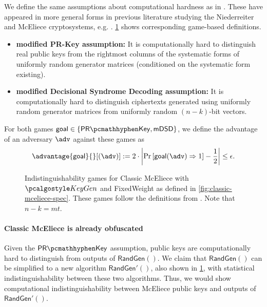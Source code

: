 We define the same assumptions about computational hardness as in \cite[Definition~K.1]{EC:Xagawa22}. These have appeared in more general forms in previous literature studying the Niederreiter and McEliece cryptosystems, e.g. \cite{AC:CouFinSen01,EC:SaiXagYam18}. \cref{fig:classic-mceliece-assumptions} shows corresponding game-based definitions.
\begin{itemize}
    \item \textbf{modified PR-Key assumption:} It is computationally hard to distinguish real public keys from the rightmost columns of the systematic forms of uniformly random generator matrices (conditioned on the systematic form existing).
    \item \textbf{modified Decisional Syndrome Decoding assumption:} It is computationally hard to distinguish ciphertexts generated using uniformly random generator matrices from uniformly random $(n-k)$-bit vectors.
\end{itemize}

For both games $\mathsf{goal} \in \{\prkey, \mdsd\}$, we define the advantage of an adversary $\adv$ against these games as
\[
    \advantage{\mathsf{goal}}{}[(\adv)]
    := 2 \cdot \left| \Pr\left[\mathsf{goal}(\adv) \Rightarrow 1\right] - \frac{1}{2} \right|
    \leq \epsilon.
\]

\begin{figure}
    
    \caption[
        Indistinguishability games for Classic McEliece.
    ]{
        Indistinguishability games for Classic McEliece with $\kgen$ and \textsf{FixedWeight} as defined in \cref{fig:classic-mceliece-spec}. These games follow the definitions from \cite[Definition~K.1]{EC:Xagawa22}. Note that $n-k = mt$.}
    \label{fig:classic-mceliece-assumptions}
\end{figure}

\paragraph{Classic McEliece is already obfuscated}

Given the $\prkey$ assumption, public keys are computationally hard to distinguish from outputs of $\textsf{RandGen}()$. We claim that $\textsf{RandGen}()$ can be simplified to a new algorithm $\textsf{RandGen}'()$, also shown in \cref{fig:classic-mceliece-assumptions}, with statistical indistinguishability between these two algorithms. Thus, we would show computational indistinguishability between McEliece public keys and outputs of $\textsf{RandGen}'()$.

